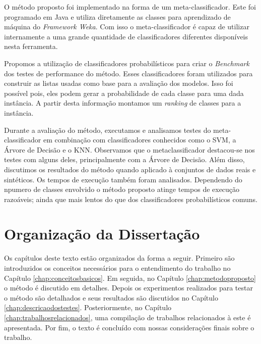 O método proposto foi implementado na forma de um meta-classificador.
Este foi programado em Java e utiliza diretamente as classes para aprendizado de máquina do \textit{Framework Weka}.
Com isso o meta-classificador é capaz de utilizar internamente a uma grande quantidade de classificadores diferentes disponíveis nesta ferramenta.

Propomos a utilização de classificadores probabilísticos para criar o \textit{Benchmark} dos testes de performance do método. 
Esses classificadores foram utilizados para construir as listas usadas como base para a avaliação dos modelos.
Isso foi possível pois, eles podem gerar a probabilidade de cada classe para uma dada instância.
A partir desta informação montamos um \textit{ranking} de classes para a instância.

Durante a avaliação do método, executamos e analisamos testes do meta-classificador em combinação com classificadores conhecidos como o SVM, a Árvore de Decisão e o KNN.
Observamos que o metaclassificador destacou-se nos testes com alguns deles, principalmente com a Árvore de Decisão.
Além disso, discutimos os resultados do método quando aplicado à conjuntos de dados reais e sintéticos.
Os tempos de execução também foram analisados.
Dependendo do npumero de classes envolvido o método proposto atinge tempos de execução razoáveis; ainda que mais lentos do que dos classificadores probabilísticos comuns.

\section{Organização da Dissertação}

Os capítulos deste texto estão organizados da forma a seguir.
Primeiro são introduzidos os conceitos necessários para o entendimento do trabalho no Capítulo \ref{chap:conceitosbasicos}.
Em seguida, no Capítulo \ref{chap:metodoproposto} o método é discutido em detalhes.
Depois os experimentos realizados para testar o método são detalhados e seus resultados são discutidos no Capítulo \ref{chap:descricaodostestes}.
Posteriormente, no Capítulo \ref{chap:trabalhosrelacionados}, uma compilação de trabalhos relacionados à este é apresentada.
Por fim, o texto é concluído com nossas considerações finais sobre o trabalho.
